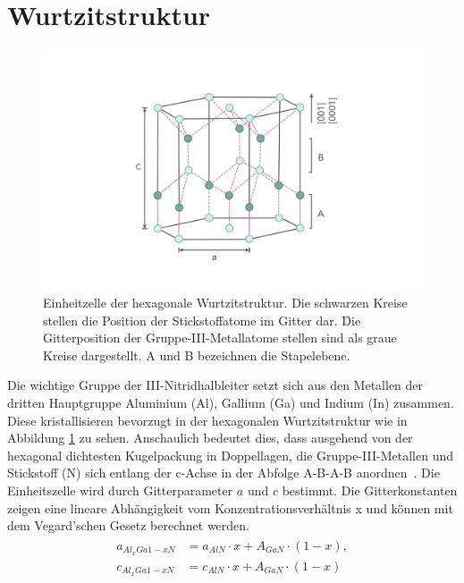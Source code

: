 \section{Wurtzitstruktur}

\begin{figure}[!htb]
    \centering
    \begin{minipage}[t]{\linewidth}
        \centering
        \includegraphics[width=0.8\linewidth]{Bilder/Wurtzite.png}
    \end{minipage}%
     \caption{Einheitzelle der hexagonale Wurtzitstruktur. Die schwarzen Kreise stellen die Position der Stickstoffatome im Gitter dar. Die Gitterposition der Gruppe-III-Metallatome stellen sind als graue Kreise dargestellt. A und B bezeichnen die Stapelebene.  }
        \label{fig:wurtz}
\end{figure}
\noindent
Die wichtige Gruppe der III-Nitridhalbleiter setzt sich aus den Metallen
der dritten Hauptgruppe Aluminium (Al), Gallium (Ga) und Indium (In) zusammen.
Diese kristallisieren bevorzugt in der hexagonalen Wurtzitstruktur wie in Abbildung \ref{fig:wurtz} zu sehen.
Anschaulich bedeutet dies, dass ausgehend von der hexagonal dichtesten Kugelpackung in Doppellagen, die Gruppe-III-Metallen und Stickstoff (N) sich entlang der c-Achse in der Abfolge A-B-A-B anordnen~\cite{buchc}. Die Einheitszelle wird durch Gitterparameter $a$ und $c$ bestimmt. Die Gitterkonstanten zeigen eine lineare Abhängigkeit vom Konzentrationsverhältnis x und können mit dem Vegard'schen Gesetz berechnet werden.
%
\begin{align}
\begin{split}
    a_{Al_{x}Ga{1-x}N} &= a_{AlN} \cdot x + A_{GaN} \cdot (1-x)  ,
    \\
    c_{Al_{x}Ga{1-x}N} &= c_{AlN} \cdot x + A_{GaN} \cdot (1-x) 
\end{split}
\end{align}
